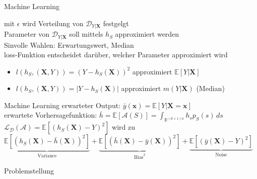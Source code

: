 \documentclass[17pt, fleqn]{beamer}
\begin{document}
\begin{frame}{Machine Learning}
    \small{
        mit $ \epsilon $ wird Verteilung von $ \mathcal{D}_{Y|\mathbf{X}} $ festgelgt \\ [0.2cm]
        Parameter von $ \mathcal{D}_{Y|\mathbf{X}} $ soll mittels $ h_S $ approximiert werden \\ [0.2cm]
        Sinvolle Wahlen: Erwartungswert, Median \\ [0.2cm]
        loss-Funktion entscheidet darüber, welcher Parameter approximiert wird
        \begin{itemize}
            \item $l(h_S, (\mathbf{X}, Y)) = (Y - h_S(\mathbf{X}))^2 $ approximiert $\mathbb{E}[Y|\mathbf{X}] $
            \item $l(h_S, (\mathbf{X}, Y)) = |Y- h_S(\mathbf{X})| $ approximiert $m(Y|\mathbf{X}) $ (Median) 
        \end{itemize}
    }
\end{frame}

\begin{frame}{Machine Learning}
    \small{
        erwarteter Output: $ \bar{y}(\mathbf{x}) = \mathbb{E}[Y|\mathbf{X} = \mathbf{x}] $ \\[0.5cm]
        erwartete Vorhersagefunktion: $ \bar{h} = \mathbb{E}[\mathcal{A}(S)] = \int_{\mathbb{R}^{(d+1)n}} h_s p_S(s)  \,ds $ \\[0.5cm]
        $ \mathcal{L}_{\mathcal{D}}(\mathcal{A}) = \mathbb{E}[(h_S(\mathbf{\mathbf{X}})-Y)^2] $ wird zu \\[0.5cm]
        \footnotesize{$ \underbrace{\mathbb{E}[(h_S(\mathbf{X})- \bar{h}(\mathbf{X}))^2]}_{\text{Variance}}+\underbrace{\mathbb{E}[(\bar{h}(\mathbf{X})-\bar{y}(\mathbf{X}))^2]}_{\text{Bias}^2} + \underbrace{\mathbb{E}[(\bar{y}(\mathbf{X})-Y)^2]}_{\text{Noise}} $
    }}
    
\end{frame}


\begin{frame}{Problemstellung}
    \begin{scriptsize}
	\end{scriptsize}
    
\end{frame}
\end{document}
